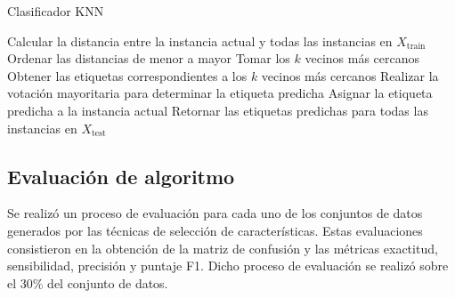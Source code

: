 \begin{algorithm}
\caption{Clasificador KNN}
\begin{algorithmic}[1]
        \State Calcular la distancia entre la instancia actual y todas las instancias en $X_{\text{train}}$
        \State Ordenar las distancias de menor a mayor
        \State Tomar los $k$ vecinos más cercanos
        \State Obtener las etiquetas correspondientes a los $k$ vecinos más cercanos
        \State Realizar la votación mayoritaria para determinar la etiqueta predicha
        \State Asignar la etiqueta predicha a la instancia actual
    \EndFor
    \State Retornar las etiquetas predichas para todas las instancias en $X_{\text{test}}$
\EndProcedure
\end{algorithmic}
\label{Alg: KNN}
\end{algorithm}

\subsection{Evaluación de algoritmo}
Se realizó un proceso de evaluación para cada uno de los conjuntos de datos generados por las técnicas de selección de características. Estas evaluaciones consistieron en la obtención de la matriz de confusión y las métricas exactitud, sensibilidad, precisión y puntaje F1. Dicho proceso de evaluación se realizó sobre el 30\% del conjunto de datos.
